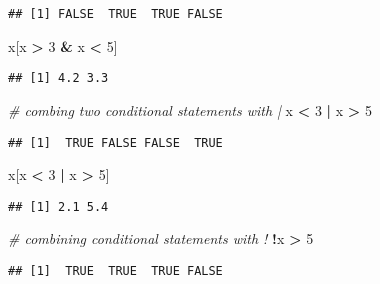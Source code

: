 \documentclass[
]{book}
\newenvironment{Shaded}{\begin{snugshade}}{\end{snugshade}}
\newcommand{\CommentTok}[1]{\textcolor[rgb]{0.56,0.35,0.01}{\textit{#1}}}
\newcommand{\DecValTok}[1]{\textcolor[rgb]{0.00,0.00,0.81}{#1}}
\newcommand{\NormalTok}[1]{#1}
\newcommand{\OperatorTok}[1]{\textcolor[rgb]{0.81,0.36,0.00}{\textbf{#1}}}
\newcommand{\StringTok}[1]{\textcolor[rgb]{0.31,0.60,0.02}{#1}}
\begin{document}
\begin{verbatim}
## [1] FALSE  TRUE  TRUE FALSE
\end{verbatim}

\begin{Shaded}
\begin{Highlighting}[]
\NormalTok{x[x }\OperatorTok{\textgreater{}}\StringTok{ }\DecValTok{3} \OperatorTok{\&}\StringTok{ }\NormalTok{x }\OperatorTok{\textless{}}\StringTok{ }\DecValTok{5}\NormalTok{]}
\end{Highlighting}
\end{Shaded}

\begin{verbatim}
## [1] 4.2 3.3
\end{verbatim}

\begin{Shaded}
\begin{Highlighting}[]
\CommentTok{\# combing two conditional statements with |}
\NormalTok{x }\OperatorTok{\textless{}}\StringTok{ }\DecValTok{3} \OperatorTok{|}\StringTok{ }\NormalTok{x }\OperatorTok{\textgreater{}}\StringTok{ }\DecValTok{5}
\end{Highlighting}
\end{Shaded}

\begin{verbatim}
## [1]  TRUE FALSE FALSE  TRUE
\end{verbatim}

\begin{Shaded}
\begin{Highlighting}[]
\NormalTok{x[x }\OperatorTok{\textless{}}\StringTok{ }\DecValTok{3} \OperatorTok{|}\StringTok{ }\NormalTok{x }\OperatorTok{\textgreater{}}\StringTok{ }\DecValTok{5}\NormalTok{]}
\end{Highlighting}
\end{Shaded}

\begin{verbatim}
## [1] 2.1 5.4
\end{verbatim}

\begin{Shaded}
\begin{Highlighting}[]
\CommentTok{\# combining conditional statements with !}
\OperatorTok{!}\NormalTok{x }\OperatorTok{\textgreater{}}\StringTok{ }\DecValTok{5}
\end{Highlighting}
\end{Shaded}

\begin{verbatim}
## [1]  TRUE  TRUE  TRUE FALSE
\end{verbatim}
\end{document}
